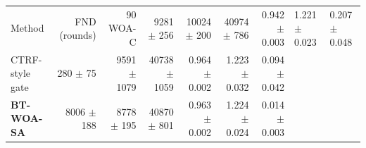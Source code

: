 \begin{tabular}{lrrrrrr}
\toprule
Method & FND (rounds) & 90 %
\midrule
WOA-C & 9281 $\pm$ 256 & 10024 $\pm$ 200 & 40974 $\pm$ 786 & 0.942 $\pm$ 0.003 & 1.221 $\pm$ 0.023 & 0.207 $\pm$ 0.048 \\
CTRF-style gate & 280 $\pm$ 75 & 9591 $\pm$ 1079 & 40738 $\pm$ 1059 & 0.964 $\pm$ 0.002 & 1.223 $\pm$ 0.032 & 0.094 $\pm$ 0.042 \\
\textbf{BT-WOA-SA} & 8006 $\pm$ 188 & 8778 $\pm$ 195 & 40870 $\pm$ 801 & 0.963 $\pm$ 0.002 & 1.224 $\pm$ 0.024 & 0.014 $\pm$ 0.003 \\
\bottomrule
\end{tabular}